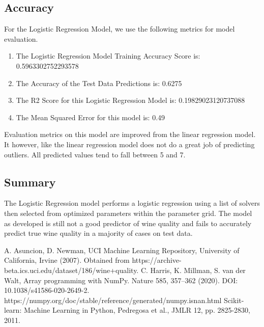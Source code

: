 \documentclass[titlepage]{article}
\begin{document}
	\subsection*{Accuracy}
	For the Logistic Regression Model, we use the following metrics for model evaluation.
	\begin{enumerate}
		\item The Logistic Regression Model Training Accuracy Score is: 0.5963302752293578
		\item The Accuracy of the Test Data Predictions is: 0.6275 
		\item The R2 Score for this Logistic Regression Model is: 0.19829023120737088 
		\item The Mean Squared Error for this model is: 0.49
		
	\end{enumerate}
	
	Evaluation metrics on this model are improved from the linear regression model. It however, like the linear regression model does not do a great job of predicting outliers. All predicted values tend to fall between 5 and 7.
	
	\subsection*{Summary}
	The Logistic Regression model performs a logistic regression using a list of solvers then selected from optimized parameters within the parameter grid. The model as developed is still not a good predictor of wine quality and fails to accurately predict true wine quality in a majority of cases on test data.
	
	\begin{thebibliography}{9}
		 A. Asuncion, D. Newman, UCI Machine Learning Repository, University of California, Irvine  (2007).  Obtained from https://archive-beta.ics.uci.edu/dataset/186/wine+quality. 
		 C. Harris, K. Millman, S. van der Walt,  Array programming with NumPy. Nature 585, 357–362 (2020). DOI: 10.1038/s41586-020-2649-2.  https://numpy.org/doc/stable/reference/generated/numpy.isnan.html
		Scikit-learn: Machine Learning in Python, Pedregosa et al., JMLR 12, pp. 2825-2830, 2011. 
	\end{thebibliography}
	
\end{document}
